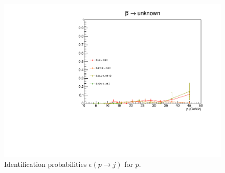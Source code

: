 \begin{figure}[!p]
  \includegraphics[scale=0.38]{./gfx/pm_u.pdf}
	\caption{Identification probabilities $\epsilon(p \rightarrow j)$ for $\bar{p}$.}
	\label{pic:Effpm}
\end{figure}

